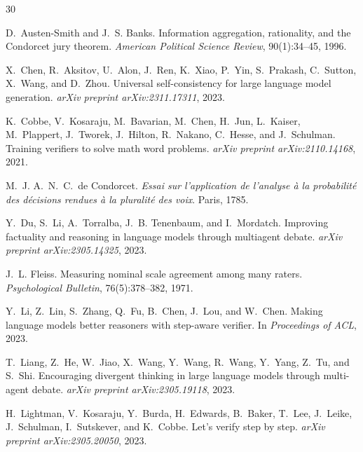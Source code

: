 \documentclass[11pt,a4paper]{article}
\begin{document}
\begin{thebibliography}{30}

D.~Austen-Smith and J.~S. Banks.
\newblock Information aggregation, rationality, and the Condorcet jury theorem.
\newblock \emph{American Political Science Review}, 90(1):34--45, 1996.

X.~Chen, R.~Aksitov, U.~Alon, J.~Ren, K.~Xiao, P.~Yin, S.~Prakash, C.~Sutton, X.~Wang, and D.~Zhou.
\newblock Universal self-consistency for large language model generation.
\newblock \emph{arXiv preprint arXiv:2311.17311}, 2023.

K.~Cobbe, V.~Kosaraju, M.~Bavarian, M.~Chen, H.~Jun, L.~Kaiser, M.~Plappert, J.~Tworek, J.~Hilton, R.~Nakano, C.~Hesse, and J.~Schulman.
\newblock Training verifiers to solve math word problems.
\newblock \emph{arXiv preprint arXiv:2110.14168}, 2021.

M.~J. A.~N.~C.~de Condorcet.
\newblock \emph{Essai sur l'application de l'analyse \`a la probabilit\'e des d\'ecisions rendues \`a la pluralit\'e des voix}.
\newblock Paris, 1785.

Y.~Du, S.~Li, A.~Torralba, J.~B. Tenenbaum, and I.~Mordatch.
\newblock Improving factuality and reasoning in language models through multiagent debate.
\newblock \emph{arXiv preprint arXiv:2305.14325}, 2023.

J.~L. Fleiss.
\newblock Measuring nominal scale agreement among many raters.
\newblock \emph{Psychological Bulletin}, 76(5):378--382, 1971.

Y.~Li, Z.~Lin, S.~Zhang, Q.~Fu, B.~Chen, J.~Lou, and W.~Chen.
\newblock Making language models better reasoners with step-aware verifier.
\newblock In \emph{Proceedings of ACL}, 2023.

T.~Liang, Z.~He, W.~Jiao, X.~Wang, Y.~Wang, R.~Wang, Y.~Yang, Z.~Tu, and S.~Shi.
\newblock Encouraging divergent thinking in large language models through multi-agent debate.
\newblock \emph{arXiv preprint arXiv:2305.19118}, 2023.

H.~Lightman, V.~Kosaraju, Y.~Burda, H.~Edwards, B.~Baker, T.~Lee, J.~Leike, J.~Schulman, I.~Sutskever, and K.~Cobbe.
\newblock Let's verify step by step.
\newblock \emph{arXiv preprint arXiv:2305.20050}, 2023.


\end{thebibliography}
\end{document}
